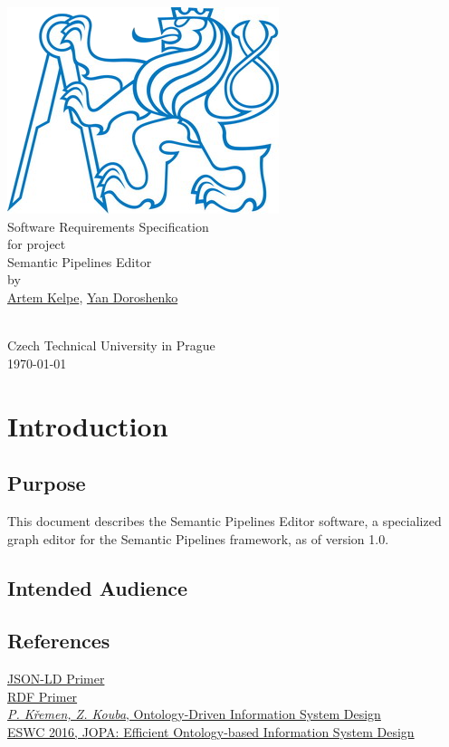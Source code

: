 \documentclass{article}
\begin{document}
\begin{center}
    \rule{0pt}{0pt}
    \vfill
    \includegraphics[scale=0.9]{logo.png}\\
    {\huge Software Requirements Specification\\}
    for project\\
    {\Large Semantic Pipelines Editor\\}
    by\\
    {\large\href{mailto:kelpeart@fel.cvut.cz}{Artem Kelpe}, \href{mailto:dorosyan@fel.cvut.cz}{Yan Doroshenko}\\}
    \vfill
    \rule{0pt}{90pt}\\
    {\large Czech Technical University in Prague\\} \today
\end{center}
\newpage
\tableofcontents
\newpage
{}
\setcounter{page}{3}
\section{Introduction}
\subsection{Purpose}
This document describes the Semantic Pipelines Editor software, a specialized graph editor for the Semantic Pipelines framework, as of version 1.0.
\subsection{Intended Audience}
\subsection{References}
\href{http://json-ld.org/primer/latest/}{JSON-LD Primer}\\
\href{https://www.w3.org/TR/rdf11-primer/}{RDF Primer}\\
\href{http://ieeexplore.ieee.org/document/6011704/?arnumber=6011704\&tag=1}{\textit{P. Křemen, Z. Kouba}, Ontology-Driven Information System Design}\\
\href{http://2016.eswc-conferences.org/sites/default/files/papers/Accepted\%20Posters\%20and\%20Demos/ESWC2016\_DEMO\_JOPA.pdf}{ESWC 2016, JOPA: Efficient Ontology-based Information System Design}
\end{document}

